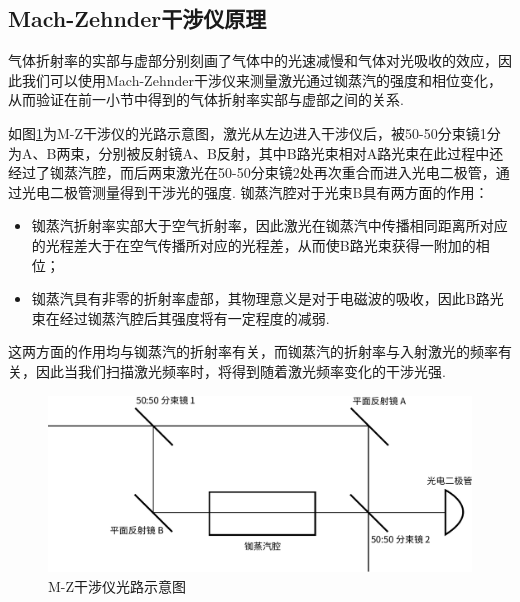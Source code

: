 \documentclass[a4paper, 10pt]{article}
\begin{document}
\begin{multicols*}{2}
\subsection{Mach-Zehnder干涉仪原理}

气体折射率的实部与虚部分别刻画了气体中的光速减慢和气体对光吸收的效应，因此我们可以使用Mach-Zehnder干涉仪来测量激光通过铷蒸汽的强度和相位变化，从而验证在前一小节中得到的气体折射率实部与虚部之间的关系.

如图\ref{M-Z}为M-Z干涉仪的光路示意图，激光从左边进入干涉仪后，被50-50分束镜1分为A、B两束，分别被反射镜A、B反射，其中B路光束相对A路光束在此过程中还经过了铷蒸汽腔，而后两束激光在50-50分束镜2处再次重合而进入光电二极管，通过光电二极管测量得到干涉光的强度. 铷蒸汽腔对于光束B具有两方面的作用：
\begin{itemize}
    \item 铷蒸汽折射率实部大于空气折射率，因此激光在铷蒸汽中传播相同距离所对应的光程差大于在空气传播所对应的光程差，从而使B路光束获得一附加的相位；
    \item 铷蒸汽具有非零的折射率虚部，其物理意义是对于电磁波的吸收，因此B路光束在经过铷蒸汽腔后其强度将有一定程度的减弱.
\end{itemize}
这两方面的作用均与铷蒸汽的折射率有关，而铷蒸汽的折射率与入射激光的频率有关，因此当我们扫描激光频率时，将得到随着激光频率变化的干涉光强.
\begin{figure}[H]
    \centering
    \includegraphics[width=.9\columnwidth]{M-Z-Interferometer.pdf}
    \caption{M-Z干涉仪光路示意图}
    \label{M-Z}
\end{figure}


\end{multicols*}
\end{document}
